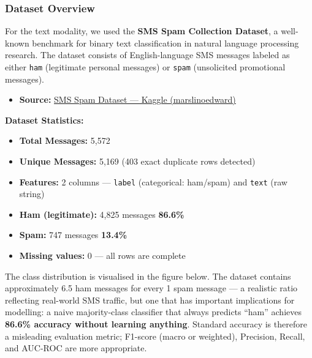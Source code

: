 
\subsubsection{Dataset Overview}
For the text modality, we used the \textbf{SMS Spam Collection Dataset}, a well-known benchmark for binary text classification in natural language processing research. The dataset consists of English-language SMS messages labeled as either \texttt{ham} (legitimate personal messages) or \texttt{spam} (unsolicited promotional messages).

\begin{itemize}
    \item \textbf{Source:} \href{https://www.kaggle.com/datasets/marslinoedward/sms-spam-dataset/data}{SMS Spam Dataset --- Kaggle (marslinoedward)}
\end{itemize}

\begin{importantbox}
\textbf{Dataset Statistics:}
\begin{itemize}
    \item \textbf{Total Messages:} 5{,}572
    \item \textbf{Unique Messages:} 5{,}169 \hfill (403 exact duplicate rows detected)
    \item \textbf{Features:} 2 columns --- \texttt{label} (categorical: ham/spam) and \texttt{text} (raw string)
    \item \textbf{Ham (legitimate):} 4{,}825 messages \quad \textbf{86.6\%}
    \item \textbf{Spam:} 747 messages \quad \textbf{13.4\%}
    \item \textbf{Missing values:} 0 --- all rows are complete
\end{itemize}
\end{importantbox}

The class distribution is visualised in the figure below. The dataset contains approximately 6.5 ham messages for every 1 spam message --- a realistic ratio reflecting real-world SMS traffic, but one that has important implications for modelling: a naive majority-class classifier that always predicts ``ham'' achieves \textbf{86.6\% accuracy without learning anything}. Standard accuracy is therefore a misleading evaluation metric; F1-score (macro or weighted), Precision, Recall, and AUC-ROC are more appropriate.

